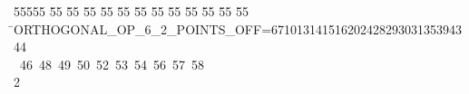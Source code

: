 %
%
\begin{tabbing}
55555 \= 55 \= 55 \= 55 \= 55 \= 55 \= 55 \= 55 \= 55 \= 55 \= 55 \= 55 \= 55 \= \>ORTHOGONAL\_OP\_6\_2\_POINTS\_OFF=671013141516202428293031353943\ 44\ \\[0pt]
\ 46\ 48\ 49\ 50\ 52\ 53\ 54\ 56\ 57\ 58\\[0pt]
2\>\end{tabbing}
